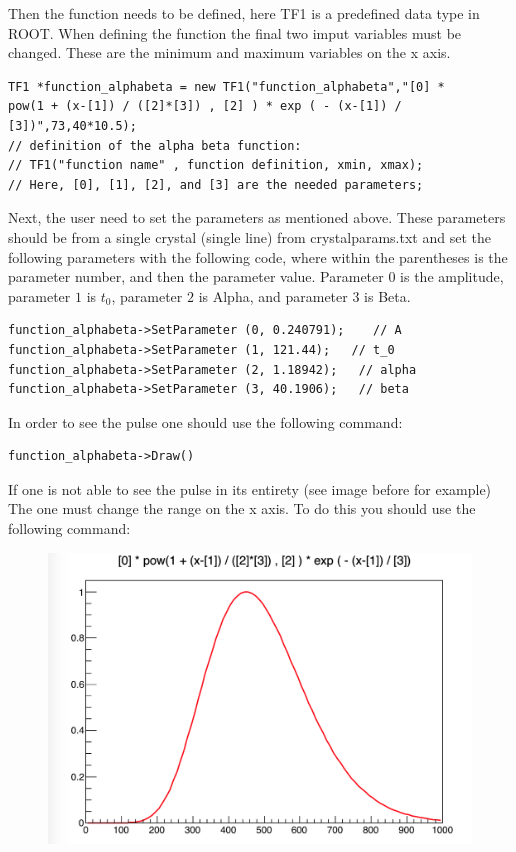 \documentclass{article}
\begin{document}
Then the function needs to be defined, here TF1 is a predefined data type in ROOT. When defining the function the final two imput variables must be changed. These are the minimum and maximum variables on the x axis. 
\begin{verbatim} 
TF1 *function_alphabeta = new TF1("function_alphabeta","[0] * 
pow(1 + (x-[1]) / ([2]*[3]) , [2] ) * exp ( - (x-[1]) / [3])",73,40*10.5);
// definition of the alpha beta function: 
// TF1("function name" , function definition, xmin, xmax);
// Here, [0], [1], [2], and [3] are the needed parameters;
  \end{verbatim}
  
Next, the user need to set the parameters as mentioned above. These parameters should be from a single crystal (single line) from crystalparams.txt and set the following parameters with the following code, where within the parentheses is the parameter number, and then the parameter value. Parameter $0$ is the amplitude, parameter $1$ is $t_0$, parameter $2$ is Alpha, and parameter $3$ is Beta. 

 \begin{verbatim} 
function_alphabeta->SetParameter (0, 0.240791);    // A 
function_alphabeta->SetParameter (1, 121.44);   // t_0 
function_alphabeta->SetParameter (2, 1.18942);   // alpha 
function_alphabeta->SetParameter (3, 40.1906);   // beta 
\end{verbatim}

In order to see the pulse one should use the following command: 
 \begin{verbatim} 
function_alphabeta->Draw()
\end{verbatim}

If one is not able to see the pulse in its entirety (see image before for example) The one must change the range on the x axis. To do this you should use the following command: 

 \begin{figure}[h!] 
    \includegraphics[width=.5\linewidth]{pulse2.png} 
 \end{figure} 
 
\end{document}
